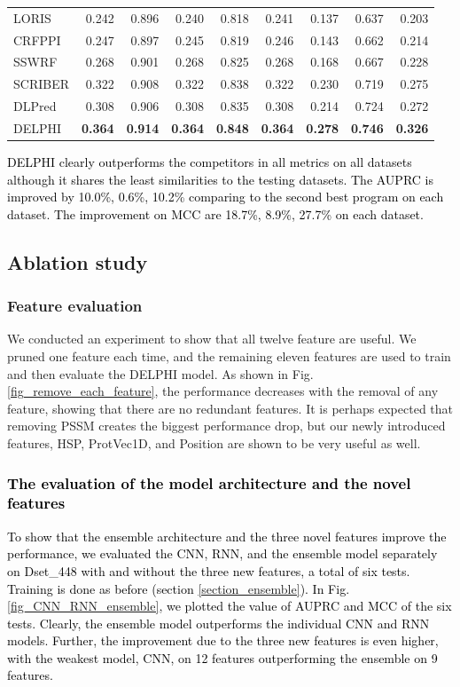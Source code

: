 \documentclass{bioinfo}
\newcommand{\myColor}{black}
\begin{document}
\begin{table}[H]
\begin{tabular}{@{}l@{\ }*{8}{r}}
    LORIS & 0.242 & 0.896 & 0.240 & 0.818 & 0.241 & 0.137 & 0.637 & 0.203 \\
    CRFPPI & 0.247 & 0.897 & 0.245 & 0.819 & 0.246 & 0.143 & 0.662 & 0.214 \\
    SSWRF & 0.268 & 0.901 & 0.268 & 0.825 & 0.268 & 0.168 & 0.667 & 0.228 \\
    SCRIBER & 0.322 & 0.908 & 0.322 & 0.838 & 0.322 & 0.230 & 0.719 & 0.275 \\
    DLPred & 0.308 & 0.906 & 0.308 & 0.835 & 0.308 & 0.214 & 0.724 & 0.272 \\
    DELPHI & \textbf{0.364} & \textbf{0.914} & \textbf{0.364} & \textbf{0.848} & \textbf{0.364} & \textbf{0.278} & \textbf{0.746} & \textbf{0.326} \\
    \end{tabular}%
  \label{tab_comp_448_355}%
\end{table}%


\textcolor{\myColor}{
DELPHI clearly outperforms the competitors in all metrics on all datasets although it shares the least similarities to the testing datasets.  The AUPRC is improved by 10.0\%, 0.6\%, 10.2\% comparing to the second best program on each dataset. The improvement on MCC are 18.7\%, 8.9\%, 27.7\% on each dataset. 
}

\subsection{Ablation study}

\subsubsection{Feature evaluation}
We conducted an experiment to show that all twelve feature are useful. We pruned one feature each time, and the remaining eleven features are used to train and then evaluate the DELPHI model. As shown in Fig. \ref{fig_remove_each_feature}, the performance decreases with the removal of any feature, showing that there are no redundant features. It is perhaps expected that  removing PSSM creates the biggest performance drop, but our newly introduced features, HSP, ProtVec1D, and Position are shown to be  very useful as well. 

\textcolor{\myColor}{
\subsubsection{The evaluation of the model architecture and the novel features}
To show that the ensemble architecture and the three novel features improve the performance, we evaluated the CNN, RNN, and the ensemble model separately on Dset\_448 with and without the three new features, a total of six tests. Training is done as before (section \ref{section_ensemble}). In Fig. \ref{fig_CNN_RNN_ensemble}, we plotted the value of AUPRC and MCC of the six tests. Clearly, the ensemble model outperforms the individual CNN and RNN models. Further, the improvement due to the three new features is even higher, with the weakest model, CNN, on 12 features outperforming the ensemble on 9 features. }
\end{document}
